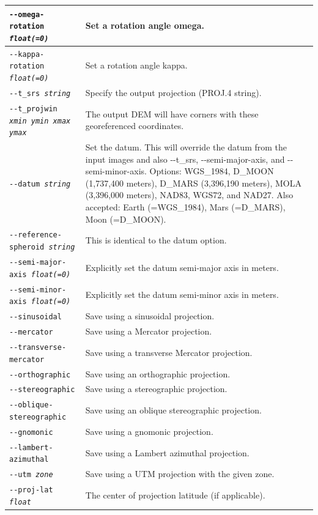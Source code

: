 \begin{longtable}{|p{8cm}|p{9cm}|}
\texttt{-\/-omega-rotation \textit{float(=0)}} & Set a rotation angle omega. \\ \hline
\texttt{-\/-kappa-rotation \textit{float(=0)}} & Set a rotation angle kappa. \\ \hline
\hline
\texttt{-\/-t\_srs \textit{string}} & Specify the output projection (PROJ.4 string). \\ \hline
\texttt{-\/-t\_projwin \textit{xmin ymin xmax ymax} } & The output DEM will have corners with these georeferenced coordinates. \\ \hline
\texttt{-\/-datum \textit{string}} & Set the datum. This will override the datum from the input images and also -\/-t\_srs, -\/-semi-major-axis, and -\/-semi-minor-axis. Options: WGS\_1984, D\_MOON (1,737,400 meters), D\_MARS (3,396,190 meters), MOLA (3,396,000 meters), NAD83, WGS72, and NAD27. Also accepted: Earth (=WGS\_1984), Mars (=D\_MARS), Moon (=D\_MOON). \\ \hline
\texttt{-\/-reference-spheroid \textit{string}} & This is identical to the datum option. \\ \hline
\texttt{-\/-semi-major-axis \textit{float(=0)}} & Explicitly set the datum semi-major axis in meters.\\ \hline
\texttt{-\/-semi-minor-axis \textit{float(=0)}} & Explicitly set the datum semi-minor axis in meters.\\ \hline
\texttt{-\/-sinusoidal} & Save using a sinusoidal projection. \\ \hline
\texttt{-\/-mercator} & Save using a Mercator projection. \\ \hline
\texttt{-\/-transverse-mercator} & Save using a transverse Mercator projection. \\ \hline
\texttt{-\/-orthographic} & Save using an orthographic projection. \\ \hline
\texttt{-\/-stereographic} & Save using a stereographic projection. \\ \hline
\texttt{-\/-oblique-stereographic} & Save using an oblique stereographic projection. \\ \hline
\texttt{-\/-gnomonic} & Save using a gnomonic projection. \\ \hline
\texttt{-\/-lambert-azimuthal} & Save using a Lambert azimuthal projection. \\ \hline
\texttt{-\/-utm \textit{zone}} & Save using a UTM projection with the given zone. \\ \hline
\texttt{-\/-proj-lat \textit{float}} & The center of projection latitude (if applicable). \\ \hline

\end{longtable}
